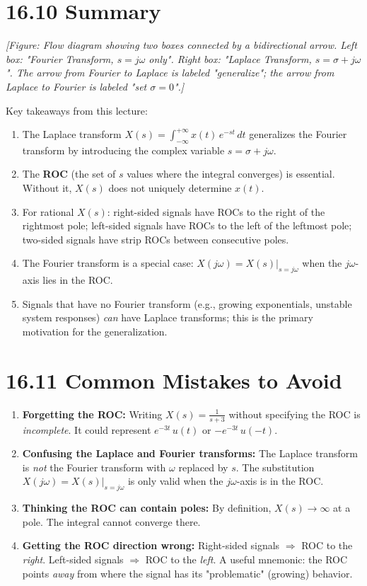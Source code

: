 \documentclass[11pt]{article}
\begin{document}
\section*{16.10 Summary}

\textit{[Figure: Flow diagram showing two boxes connected by a bidirectional arrow. Left box: "Fourier Transform, $s = j\omega$ only". Right box: "Laplace Transform, $s = \sigma + j\omega$". The arrow from Fourier to Laplace is labeled "generalize"; the arrow from Laplace to Fourier is labeled "set $\sigma = 0$".]}

Key takeaways from this lecture:

\begin{enumerate}
  \item The Laplace transform $X(s) = \int_{-\infty}^{+\infty} x(t)\,e^{-st}\,dt$ generalizes the Fourier transform by introducing the complex variable $s = \sigma + j\omega$.
  \item The \textbf{ROC} (the set of $s$ values where the integral converges) is essential. Without it, $X(s)$ does not uniquely determine $x(t)$.
  \item For rational $X(s)$: right-sided signals have ROCs to the right of the rightmost pole; left-sided signals have ROCs to the left of the leftmost pole; two-sided signals have strip ROCs between consecutive poles.
  \item The Fourier transform is a special case: $X(j\omega) = X(s)\big|_{s=j\omega}$ when the $j\omega$-axis lies in the ROC.
  \item Signals that have no Fourier transform (e.g., growing exponentials, unstable system responses) \textit{can} have Laplace transforms; this is the primary motivation for the generalization.
\end{enumerate}

\section*{16.11 Common Mistakes to Avoid}

\begin{enumerate}
  \item \textbf{Forgetting the ROC:} Writing $X(s) = \frac{1}{s+3}$ without specifying the ROC is \textit{incomplete}. It could represent $e^{-3t}\,u(t)$ or $-e^{-3t}\,u(-t)$.
  \item \textbf{Confusing the Laplace and Fourier transforms:} The Laplace transform is \textit{not} the Fourier transform with $\omega$ replaced by $s$. The substitution $X(j\omega) = X(s)\big|_{s=j\omega}$ is only valid when the $j\omega$-axis is in the ROC.
  \item \textbf{Thinking the ROC can contain poles:} By definition, $X(s) \to \infty$ at a pole. The integral cannot converge there.
  \item \textbf{Getting the ROC direction wrong:} Right-sided signals $\Rightarrow$ ROC to the \textit{right}. Left-sided signals $\Rightarrow$ ROC to the \textit{left}. A useful mnemonic: the ROC points \textit{away} from where the signal has its "problematic" (growing) behavior.
\end{enumerate}
\end{document}
